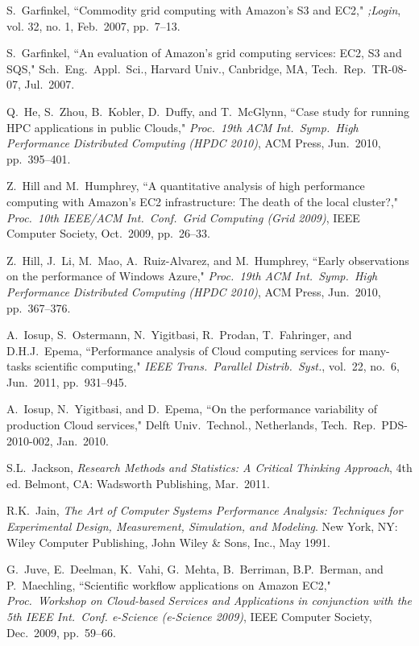 \documentclass[10pt, conference, compsocconf]{IEEEtran}
\begin{document}
\begin{thebibliography}{99}
S.~Garfinkel, ``Commodity grid computing with Amazon's S3 and EC2," \emph{;Login}, vol. 32, no. 1, Feb.~2007, pp.~7--13.

S.~Garfinkel, ``An evaluation of Amazon's grid computing services: EC2, S3 and SQS," Sch.~Eng.~Appl.~Sci., Harvard Univ., Canbridge, MA, Tech.~Rep.~TR-08-07, Jul.~2007.

Q.~He, S.~Zhou, B.~Kobler, D.~Duffy, and T.~McGlynn, ``Case study for running HPC applications in public Clouds," \emph{Proc.~19th ACM Int.~Symp.~High Performance Distributed Computing (HPDC 2010)}, ACM Press, Jun.~2010, pp.~395--401.

Z.~Hill and M.~Humphrey, ``A quantitative analysis of high performance computing with Amazon's EC2 infrastructure: The death of the local cluster?," \emph{Proc.~10th IEEE/ACM Int.~Conf.~Grid Computing (Grid 2009)}, IEEE Computer Society, Oct.~2009, pp.~26--33.

Z.~Hill, J.~Li, M.~Mao, A.~Ruiz-Alvarez, and M.~Humphrey, ``Early observations on the performance of Windows Azure," \emph{Proc.~19th ACM Int.~Symp.~High Performance Distributed Computing (HPDC 2010)}, ACM Press, Jun.~2010, pp.~367--376.

A.~Iosup, S.~Ostermann, N.~Yigitbasi, R.~Prodan, T.~Fahringer, and D.H.J.~Epema, ``Performance analysis of Cloud computing services for many-tasks scientific computing," \emph{IEEE Trans.~Parallel Distrib.~Syst.}, vol.~22, no.~6, Jun.~2011, pp.~931--945.

A.~Iosup, N.~Yigitbasi, and D.~Epema, ``On the performance variability of production Cloud services," Delft Univ.~Technol., Netherlands, Tech.~Rep.~PDS-2010-002, Jan.~2010.

S.L.~Jackson, \emph{Research Methods and Statistics: A Critical Thinking Approach}, 4th ed. Belmont, CA: Wadsworth Publishing, Mar.~2011.

R.K.~Jain, \emph{The Art of Computer Systems Performance Analysis: Techniques for Experimental Design, Measurement, Simulation, and Modeling}. New York, NY: Wiley Computer Publishing, John Wiley \& Sons, Inc., May 1991.

G.~Juve, E.~Deelman, K.~Vahi, G.~Mehta, B.~Berriman, B.P.~Berman, and P.~Maechling, ``Scientific workflow applications on Amazon EC2," \emph{Proc.~Workshop on Cloud-based Services and Applications in conjunction with the 5th IEEE Int.~Conf. e-Science (e-Science 2009)}, IEEE Computer Society, Dec.~2009, pp.~59--66.


\end{thebibliography}
\end{document}
